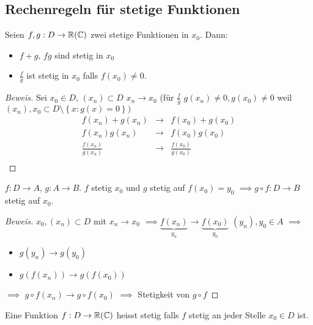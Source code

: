 \subsection{Rechenregeln f\"ur stetige Funktionen}

\begin{Sat}\label{s:rech_stet}
  Seien $f,g:D\to\mathbb{R}(\mathbb{C})$ zwei stetige Funktionen in $x_0$. Dann:
  \begin{itemize}
    \item $f+g$, $fg$ sind stetig in $x_0$
    \item $\frac{f}{g}$ ist stetig in $x_0$ falls $f(x_0)\neq 0$.
  \end{itemize}
\end{Sat}
\begin{proof}[Beweis]
  Sei $x_0\in D$, $(x_n)\subset D$ $x_n\to x_0$ (für $\frac{f}{g}$ 
$g(x_n)\neq 0, g(x_0)\neq 0$ weil $(x_n), {x_0}\subset D\setminus\left\{ x:g (x)=0 \right\})$
  \begin{align*}
    f(x_n)+g(x_n)&\to& f(x_0)+g(x_0)\\
    f(x_n)g(x_n)&\to& f(x_0)g(x_0)\\
    \frac{f(x_n)}{g(x_n)}&\to& \frac{f(x_0)}{g(x_0)}\\
  \end{align*}
\end{proof}
\begin{Sat}
  $f:D\to A$, $g:A\to B$. $f$ stetig $x_0$ und $g$ stetig
auf $f(x_0)=y_0$ $\implies g\circ f:D\to B$ stetig auf $x_0$.
\end{Sat}
\begin{proof}[Beweis]
  $x_0, (x_n)\subset D$ mit $x_n\to x_0$ 
$\implies \underbrace{f(x_n)}_{y_n}\to \underbrace{f(x_0)}_{y_0}$ $(y_n), y_0\in A$ $\implies$ 
  \begin{itemize}
    \item $g(y_n)\to g(y_0)$
    \item $g(f(x_n))\to g(f(x_0))$
  \end{itemize}
  $\implies$ $g\circ f(x_n)\to g\circ f(x_0)$ $\implies$ Stetigkeit von $g\circ f$
\end{proof}

\begin{Def}
Eine Funktion $f:D \to \mathbb{R} (\mathbb{C})$ heisst stetig falls
$f$ stetig an jeder Stelle $x_0\in D$ ist.
\end{Def}


